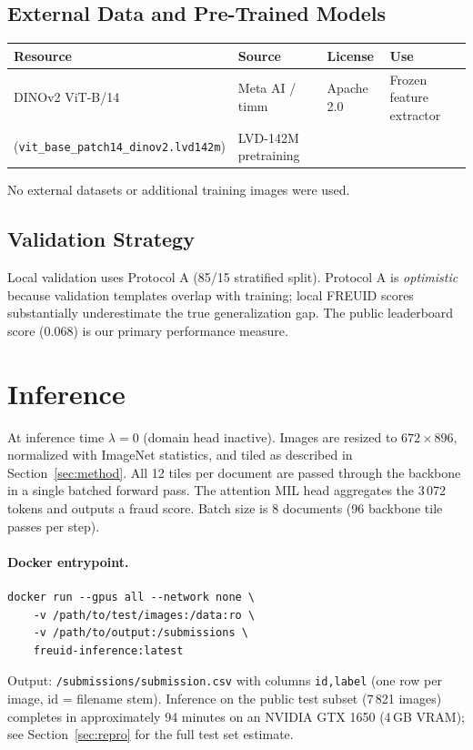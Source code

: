 \documentclass[11pt,a4paper]{article}
\begin{document}
\subsection{External Data and Pre-Trained Models}

\begin{center}
\small
\begin{tabular}{llll}
  \toprule
  Resource & Source & License & Use \\
  \midrule
  DINOv2 ViT-B/14 & Meta AI / timm & Apache 2.0 & Frozen feature extractor \\
  (\texttt{vit\_base\_patch14\_dinov2.lvd142m}) & LVD-142M pretraining & & \\
  \bottomrule
\end{tabular}
\end{center}

No external datasets or additional training images were used.

\subsection{Validation Strategy}

Local validation uses Protocol A (85/15 stratified split). Protocol A is \emph{optimistic} because validation templates overlap with training; local FREUID scores substantially underestimate the true generalization gap. The public leaderboard score (0.068) is our primary performance measure.

\section{Inference}
\label{sec:inference}

At inference time $\lambda = 0$ (domain head inactive). Images are resized to $672\times896$, normalized with ImageNet statistics, and tiled as described in Section~\ref{sec:method}. All 12 tiles per document are passed through the backbone in a single batched forward pass. The attention MIL head aggregates the 3\,072 tokens and outputs a fraud score. Batch size is 8 documents (96 backbone tile passes per step).

\paragraph{Docker entrypoint.}
\begin{verbatim}
docker run --gpus all --network none \
    -v /path/to/test/images:/data:ro \
    -v /path/to/output:/submissions \
    freuid-inference:latest
\end{verbatim}
Output: \texttt{/submissions/submission.csv} with columns \texttt{id,label} (one row per image, id = filename stem). Inference on the public test subset (7\,821 images) completes in approximately 94 minutes on an NVIDIA GTX 1650 (4\,GB VRAM); see Section~\ref{sec:repro} for the full test set estimate.
\end{document}
